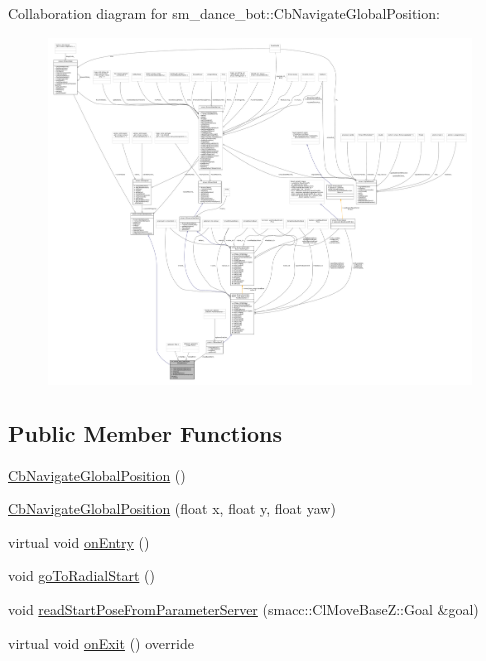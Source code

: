 Collaboration diagram for sm\+\_\+dance\+\_\+bot\+:\+:Cb\+Navigate\+Global\+Position\+:
\nopagebreak
\begin{figure}[H]
\begin{center}
\leavevmode
\includegraphics[width=350pt]{classsm__dance__bot_1_1CbNavigateGlobalPosition__coll__graph}
\end{center}
\end{figure}
\subsection*{Public Member Functions}
\begin{DoxyCompactItemize}
\item 
\hyperlink{classsm__dance__bot_1_1CbNavigateGlobalPosition_a18007aa2d7d814c39361d20c83694997}{Cb\+Navigate\+Global\+Position} ()
\item 
\hyperlink{classsm__dance__bot_1_1CbNavigateGlobalPosition_afec2628e2bf007b1356a3a328ac4f490}{Cb\+Navigate\+Global\+Position} (float x, float y, float yaw)
\item 
virtual void \hyperlink{classsm__dance__bot_1_1CbNavigateGlobalPosition_a281fe5c962ca5004f44e929159991c6a}{on\+Entry} ()
\item 
void \hyperlink{classsm__dance__bot_1_1CbNavigateGlobalPosition_a0832f7a7f205cc483be012aef9501312}{go\+To\+Radial\+Start} ()
\item 
void \hyperlink{classsm__dance__bot_1_1CbNavigateGlobalPosition_a81b78925b3ab8a426f471cb74d0b9756}{read\+Start\+Pose\+From\+Parameter\+Server} (smacc\+::\+Cl\+Move\+Base\+Z\+::\+Goal \&goal)
\item 
virtual void \hyperlink{classsm__dance__bot_1_1CbNavigateGlobalPosition_a63737ce810efefc8c29e6b1b332d2e11}{on\+Exit} () override
\end{DoxyCompactItemize}
